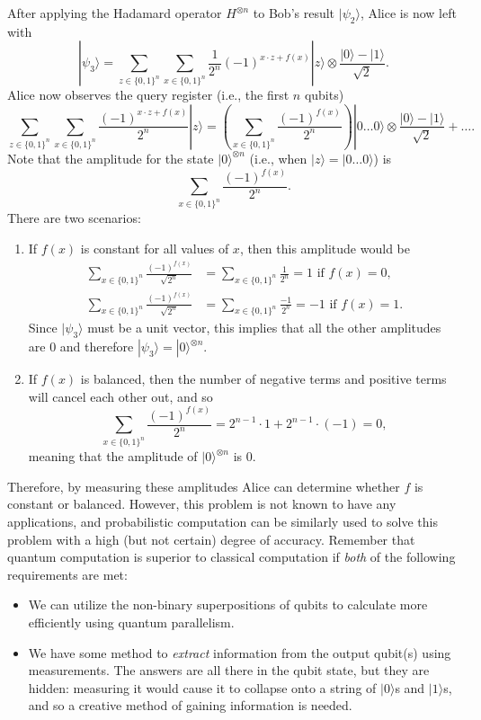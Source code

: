 \documentclass{article}
\theoremstyle{definition}
\begin{document}
After applying the Hadamard operator $H^{\otimes n}$ to Bob's result $|\psi_2 \rangle$, Alice is now left with 
\[|\psi_3 \rangle = \sum_{z \in \{0, 1\}^n} \sum_{x \in \{0, 1\}^n} \frac{1}{2^n} (-1)^{x \cdot z + f(x)} |z\rangle \otimes \frac{|0\rangle - |1\rangle}{\sqrt{2}}. \]
Alice now observes the query register (i.e., the first $n$ qubits)
\[\sum_{z \in \{0, 1\}^n} \sum_{x \in \{0, 1\}^n} \frac{(-1)^{x \cdot z + f(x)}}{2^n} |z\rangle = \left( \sum_{x \in \{0, 1\}^n} \frac{(-1)^{f(x)}}{2^n}\right) |0\ldots 0 \rangle \otimes \frac{|0\rangle - |1\rangle}{\sqrt{2}} + \ldots. \]
Note that the amplitude for the state $|0\rangle^{\otimes n}$ (i.e., when $|z\rangle = |0 \ldots 0\rangle$) is 
\[\sum_{x \in \{0, 1\}^n} \frac{(-1)^{f(x)}}{2^n}.\]
There are two scenarios: 
\begin{enumerate}
  \item If $f(x)$ is constant for all values of $x$, then this amplitude would be 
  \begin{align*} 
    \sum_{x \in \{0, 1\}^n} \frac{(-1)^{f(x)}}{\sqrt{2^n}} & = \sum_{x \in \{0, 1\}^n} \frac{1}{2^n} = 1 \text{ if } f(x) = 0, \\
    \sum_{x \in \{0, 1\}^n} \frac{(-1)^{f(x)}}{\sqrt{2^n}} & = \sum_{x \in \{0, 1\}^n} \frac{-1}{2^n} = -1 \text{ if } f(x) = 1.
  \end{align*}
  Since $|\psi_3 \rangle$ must be a unit vector, this implies that all the other amplitudes are $0$ and therefore $|\psi_3 \rangle = |0\rangle^{\otimes n}$. 
  \item If $f(x)$ is balanced, then the number of negative terms and positive terms will cancel each other out, and so 
    \[\sum_{x \in \{0, 1\}^n} \frac{(-1)^{f(x)}}{2^n} = 2^{n-1} \cdot 1 + 2^{n-1} \cdot (-1) = 0,\]
  meaning that the amplitude of $|0\rangle^{\otimes n}$ is $0$. 
\end{enumerate}
Therefore, by measuring these amplitudes Alice can determine whether $f$ is constant or balanced. However, this problem is not known to have any applications, and probabilistic computation can be similarly used to solve this problem with a high (but not certain) degree of accuracy. 
\newline\newline
Remember that quantum computation is superior to classical computation if \textit{both} of the following requirements are met: 
\begin{itemize}
  \item We can utilize the non-binary superpositions of qubits to calculate more efficiently using quantum parallelism. 
  \item We have some method to \textit{extract} information from the output qubit(s) using measurements. The answers are all there in the qubit state, but they are hidden: measuring it would cause it to collapse onto a string of $|0\rangle$s and $|1\rangle$s, and so a creative method of gaining information is needed. 
\end{itemize}
\end{document}
